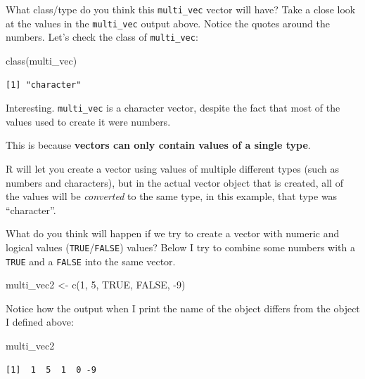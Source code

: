 \documentclass[
  letterpaper,
  DIV=11,
  numbers=noendperiod]{scrreprt}
\newenvironment{Shaded}{\begin{snugshade}}{\end{snugshade}}
\newcommand{\ConstantTok}[1]{\textcolor[rgb]{0.56,0.35,0.01}{#1}}
\newcommand{\DecValTok}[1]{\textcolor[rgb]{0.68,0.00,0.00}{#1}}
\newcommand{\FunctionTok}[1]{\textcolor[rgb]{0.28,0.35,0.67}{#1}}
\newcommand{\NormalTok}[1]{\textcolor[rgb]{0.00,0.23,0.31}{#1}}
\newcommand{\OtherTok}[1]{\textcolor[rgb]{0.00,0.23,0.31}{#1}}
\newcommand{\SpecialCharTok}[1]{\textcolor[rgb]{0.37,0.37,0.37}{#1}}
\begin{document}
What class/type do you think this \texttt{multi\_vec} vector will have?
Take a close look at the values in the \texttt{multi\_vec} output above.
Notice the quotes around the numbers. Let's check the class of
\texttt{multi\_vec}:

\begin{Shaded}
\begin{Highlighting}[]
\FunctionTok{class}\NormalTok{(multi\_vec)}
\end{Highlighting}
\end{Shaded}

\begin{verbatim}
[1] "character"
\end{verbatim}

Interesting. \texttt{multi\_vec} is a character vector, despite the fact
that most of the values used to create it were numbers.

This is because \textbf{vectors can only contain values of a single
type}.

R will let you create a vector using values of multiple different types
(such as numbers and characters), but in the actual vector object that
is created, all of the values will be \emph{converted} to the same type,
in this example, that type was ``character''.

What do you think will happen if we try to create a vector with numeric
and logical values (\texttt{TRUE}/\texttt{FALSE}) values? Below I try to
combine some numbers with a \texttt{TRUE} and a \texttt{FALSE} into the
same vector.

\begin{Shaded}
\begin{Highlighting}[]
\NormalTok{multi\_vec2 }\OtherTok{\textless{}{-}} \FunctionTok{c}\NormalTok{(}\DecValTok{1}\NormalTok{, }\DecValTok{5}\NormalTok{, }\ConstantTok{TRUE}\NormalTok{, }\ConstantTok{FALSE}\NormalTok{, }\SpecialCharTok{{-}}\DecValTok{9}\NormalTok{)}
\end{Highlighting}
\end{Shaded}

Notice how the output when I print the name of the object differs from
the object I defined above:

\begin{Shaded}
\begin{Highlighting}[]
\NormalTok{multi\_vec2}
\end{Highlighting}
\end{Shaded}

\begin{verbatim}
[1]  1  5  1  0 -9
\end{verbatim}
\end{document}
